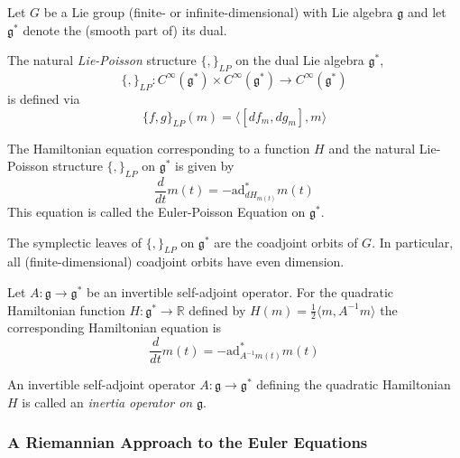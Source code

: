 Let $G$ be a Lie group (finite- or infinite-dimensional) with Lie algebra $ \mathfrak{g}$ and let $ \mathfrak{g}^*$ denote the (smooth part of) its dual.


\begin{defn}

	The natural \textit{Lie-Poisson} structure $ \{ , \}_{LP}$ on the dual Lie algebra $ \mathfrak{g}^*$,
	\[\{ , \}_{LP} : C^{\infty}( \mathfrak{g}^*) \times C^{\infty}( \mathfrak{g}^*) \to C^{\infty}( \mathfrak{g}^*)\]
is defined via
\[
	\{ f,g \}_{LP} (m) = \langle [df_m, dg_m], m \rangle
\]
\end{defn}


\begin{prop}

	The Hamiltonian equation corresponding to a function $H$ and the natural Lie-Poisson structure $ \{ , \}_{LP}$ on $ \mathfrak{g}^*$ is given by 
\[
	\frac{d}{dt}m(t) = - \mathrm{ad}^*_{dH_{m(t)}}m(t)
\]
This equation is called the Euler-Poisson Equation on $ \mathfrak{g}^*$.
\end{prop}


\begin{cor}

	The symplectic leaves of $ \{ , \}_{LP}$ on $ \mathfrak{g}^*$ are the coadjoint orbits of $G$. In particular, all (finite-dimensional) coadjoint orbits have even dimension.

\end{cor}



\begin{cor}

	Let $ A: \mathfrak{g} \to \mathfrak{g}^*$ be an invertible self-adjoint operator. For the quadratic Hamiltonian function $ H: \mathfrak{g}^* \to \mathbb{R}$ defined by $H(m) = \frac{1}{2} \langle m, A^{-1} m \rangle$ the corresponding Hamiltonian equation is 
\[
	\frac{d}{dt} m(t) = - \mathrm{ad}^*_{A^{-1}m(t)} m(t)
\]

\end{cor}




\begin{defn}

An invertible self-adjoint operator $ A: \mathfrak{g} \to \mathfrak{g}^*$ defining the quadratic Hamiltonian $H$ is called an \textit{inertia operator on} $ \mathfrak{g}$.

\end{defn}

\subsubsection{A Riemannian Approach to the Euler Equations}


